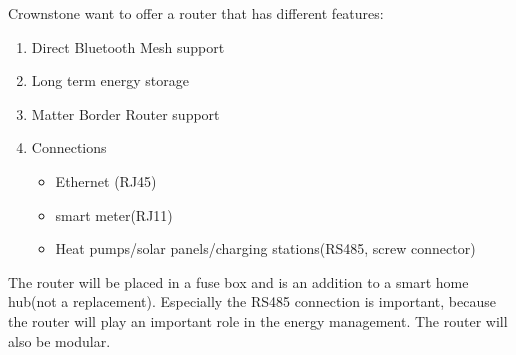 Crownstone want to offer a router that has different features:\\
\begin{enumerate}
    \item Direct Bluetooth Mesh support
    \item Long term energy storage
    \item Matter Border Router support
    \item Connections 
    \begin{itemize}
        \item Ethernet (RJ45)
        \item smart meter(RJ11)
        \item Heat pumps/solar panels/charging stations(RS485, screw connector)\\
    \end{itemize}
\end{enumerate}
The router will be placed in a fuse box and is an addition to a smart home hub(not a replacement). Especially the RS485 connection is important, because the router will play an important role in the energy management. The router will also be modular.